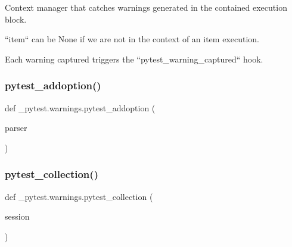 \begin{DoxyVerb}Context manager that catches warnings generated in the contained execution block.

``item`` can be None if we are not in the context of an item execution.

Each warning captured triggers the ``pytest_warning_captured`` hook.
\end{DoxyVerb}
 \mbox{\label{namespace__pytest_1_1warnings_ac0f4073b618ceebb7d9d0cd4f963c38f}} 
\subsubsection{\texorpdfstring{pytest\+\_\+addoption()}{pytest\_addoption()}}
{\footnotesize\ttfamily def \+\_\+pytest.\+warnings.\+pytest\+\_\+addoption (\begin{DoxyParamCaption}\item[{}]{parser }\end{DoxyParamCaption})}

\mbox{\label{namespace__pytest_1_1warnings_a1cd8386af75b21e83acbf236950b8d66}} 
\subsubsection{\texorpdfstring{pytest\+\_\+collection()}{pytest\_collection()}}
{\footnotesize\ttfamily def \+\_\+pytest.\+warnings.\+pytest\+\_\+collection (\begin{DoxyParamCaption}\item[{}]{session }\end{DoxyParamCaption})}

\mbox{\label{namespace__pytest_1_1warnings_aae727a9e4545555b3bcf9f8042c69eac}} 
